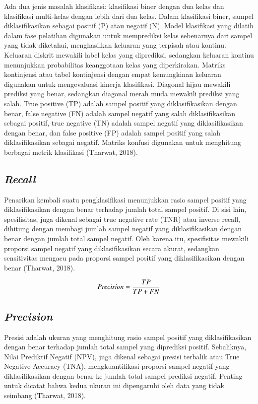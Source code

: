 Ada dua jenis masalah klasifikasi: klasifikasi biner dengan dua kelas dan klasifikasi multi-kelas dengan lebih dari dua kelas. Dalam klasifikasi biner, sampel diklasifikasikan sebagai positif (P) atau negatif (N). Model klasifikasi yang dilatih dalam fase pelatihan digunakan untuk memprediksi kelas sebenarnya dari sampel yang tidak diketahui, menghasilkan keluaran yang terpisah atau kontinu. Keluaran diskrit mewakili label kelas yang diprediksi, sedangkan keluaran kontinu menunjukkan probabilitas keanggotaan kelas yang diperkirakan. Matriks kontinjensi atau tabel kontinjensi dengan empat kemungkinan keluaran digunakan untuk mengevaluasi kinerja klasifikasi. Diagonal hijau mewakili prediksi yang benar, sedangkan diagonal merah muda mewakili prediksi yang salah. True positive (TP) adalah sampel positif yang diklasifikasikan dengan benar, false negative (FN) adalah sampel negatif yang salah diklasifikasikan sebagai positif, true negative (TN) adalah sampel negatif yang diklasifikasikan dengan benar, dan false positive (FP) adalah sampel positif yang salah diklasifikasikan sebagai negatif. Matriks konfusi digunakan untuk menghitung berbagai metrik klasifikasi (Tharwat, 2018).

\subsection{\emph{Recall}}
\label{subsec:cnn}

Penarikan kembali suatu pengklasifikasi menunjukkan rasio sampel positif yang diklasifikasikan dengan benar terhadap jumlah total sampel positif. Di sisi lain, spesifisitas, juga dikenal sebagai true negative rate (TNR) atau inverse recall, dihitung dengan membagi jumlah sampel negatif yang diklasifikasikan dengan benar dengan jumlah total sampel negatif. Oleh karena itu, spesifisitas mewakili proporsi sampel negatif yang diklasifikasikan secara akurat, sedangkan sensitivitas mengacu pada proporsi sampel positif yang diklasifikasikan dengan benar (Tharwat, 2018).

\begin{equation}
  \label{eq:KonversiPanjangLangkah}
  \emph{Precision} = \frac{TP}{TP + FN}
\end{equation}

\subsection{\emph{Precision}}
\label{subsec:cnn}

Presisi adalah ukuran yang menghitung rasio sampel positif yang diklasifikasikan dengan benar terhadap jumlah total sampel yang diprediksi positif. Sebaliknya, Nilai Prediktif Negatif (NPV), juga dikenal sebagai presisi terbalik atau True Negative Accuracy (TNA), mengkuantifikasi proporsi sampel negatif yang diklasifikasikan dengan benar ke jumlah total sampel prediksi negatif. Penting untuk dicatat bahwa kedua ukuran ini dipengaruhi oleh data yang tidak seimbang (Tharwat, 2018).


